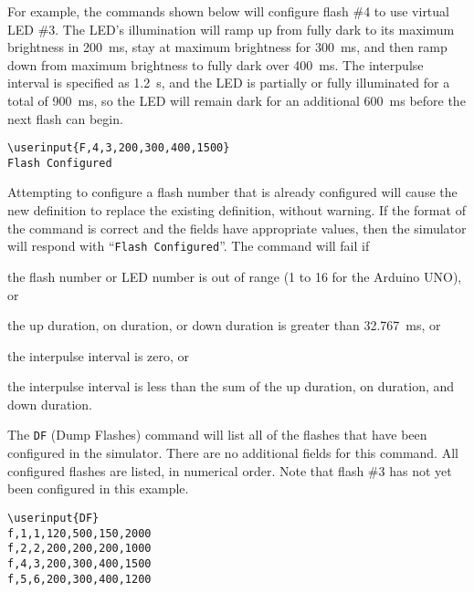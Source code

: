 \documentclass[letterpaper,11pt]{article}
\newcommand\userinput[1]{\textbf{#1}}
\begin{document}
For example, the commands shown below will configure flash \#4
to use virtual LED \#3. The LED's illumination will ramp up from fully dark to
its maximum brightness in \SI{200}{\ms}, stay at maximum brightness
for \SI{300}{\ms}, and then ramp down from maximum brightness to fully
dark over \SI{400}{\ms}. The interpulse interval is specified as
\SI{1.2}{\second}, and the LED is partially or fully illuminated for a total of
\SI{900}{\ms}, so the LED will remain dark for an additional
\SI{600}{\ms} before the next flash can begin.

\begin{tcolorbox}
\begin{Verbatim}[commandchars=\\\{\}]
\userinput{F,4,3,200,300,400,1500}
Flash Configured
\end{Verbatim}
\end{tcolorbox}

Attempting to configure a flash number that is already configured will cause
the new definition to replace the existing definition, without warning.
If the format of the command is correct and the fields have appropriate values,
then the simulator will respond with ``\texttt{Flash Configured}''. The command
will fail if
\begin{compactitem}
  \item the flash number or LED number is out of range (1 to 16 for the
    Arduino UNO), or
  \item the up duration, on duration, or down duration is greater than
    \SI{32.767}{\ms}, or
  \item the interpulse interval is zero, or
  \item the interpulse interval is less than the sum of the up duration, on
    duration, and down duration.
\end{compactitem}

The \texttt{DF} (Dump Flashes) command will list all of the flashes that
have been configured in the simulator. There are no additional fields for this
command. All configured flashes are listed, in numerical order. Note that flash
\#3 has not yet been configured in this example.

\begin{tcolorbox}
\begin{Verbatim}[commandchars=\\\{\}]
\userinput{DF}
f,1,1,120,500,150,2000
f,2,2,200,200,200,1000
f,4,3,200,300,400,1500
f,5,6,200,300,400,1200
\end{Verbatim}
\end{tcolorbox}
\end{document}

